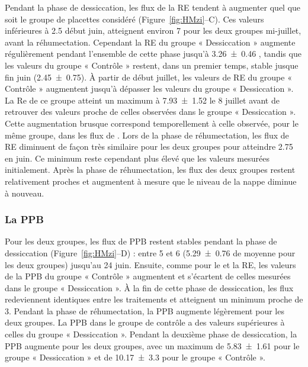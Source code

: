 Pendant la phase de dessiccation, les flux de la RE tendent à augmenter quel que soit le groupe de placettes considéré (Figure~\ref{fig:HMzi}--C).
Ces valeurs inférieures à \SI{2.5}{\uml} début juin, atteignent environ \SI{7}{\uml} pour les deux groupes mi-juillet, avant la réhumectation.
Cependant la RE du groupe « Dessiccation » augmente régulièrement pendant l'ensemble de cette phase jusqu'à \SI{3.26(046)}{\uml} , tandis que les valeurs du groupe « Contrôle » restent, dans un premier temps, stable jusque fin juin (\SI{2.45(075)}{\uml}).
À partir de début juillet, les valeurs de RE du groupe « Contrôle » augmentent jusqu'à dépasser les valeurs du groupe « Dessiccation ».
La Re de ce groupe atteint un maximum à \SI{7.93(152)}{\uml} le 8 juillet avant de retrouver des valeurs proche de celles observées dans le groupe « Dessiccation ».
Cette augmentation brusque correspond temporellement à celle observée, pour le même groupe, dans les flux de \chh.
Lors de la phase de réhumectation, les flux de RE diminuent de façon très similaire pour les deux groupes pour atteindre \SI{2.75}{\uml} en juin.
Ce minimum reste cependant plus élevé que les valeurs mesurées initialement.
Après la phase de réhumectation, les flux des deux groupes restent relativement proches et augmentent à mesure que le niveau de la nappe diminue à nouveau.

\subsubsection{La PPB}

Pour les deux groupes, les flux de PPB restent stables pendant la phase de dessiccation (Figure~\ref{fig:HMzi}--D) :
entre 5 et \SI{6}{\uml} (\SI{5.29(076)}{\uml} de moyenne pour les deux groupes) jusqu'au 24 juin.
Ensuite, comme pour le \chh et la RE, les valeurs de la PPB du groupe « Contrôle » augmentent et s'écartent de celles mesurées dans le groupe « Dessiccation ».
À la fin de cette phase de dessiccation, les flux redeviennent identiques entre les traitements et atteignent un minimum proche de \SI{3}{\uml}.
Pendant la phase de réhumectation, la PPB augmente légèrement pour les deux groupes.
La PPB dans le groupe de contrôle a des valeurs supérieures à celles du groupe « Dessiccation ».
Pendant la deuxième phase de dessiccation, la PPB augmente pour les deux groupes, avec un maximum de \SI{5.83(161)}{\uml} pour le groupe « Dessiccation » et de \SI{10.17(330)}{\uml} pour le groupe « Contrôle ».

